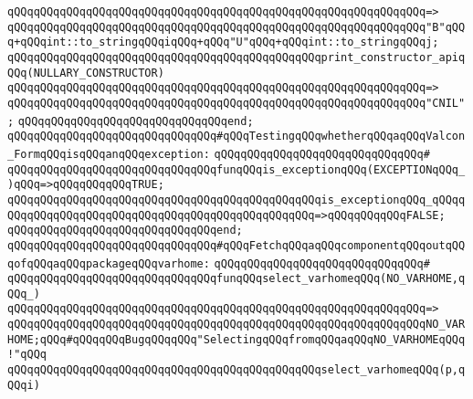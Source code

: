 \verb|qQQqqQQqqQQqqQQqqQQqqQQqqQQqqQQqqQQqqQQqqQQqqQQqqQQqqQQqqQQqqQQq=>|\newline
\verb|qQQqqQQqqQQqqQQqqQQqqQQqqQQqqQQqqQQqqQQqqQQqqQQqqQQqqQQqqQQqqQQq"B"qQQq+qQQqint::to_stringqQQqiqQQq+qQQq"U"qQQq+qQQqint::to_stringqQQqj;|\newline
\newline
\verb|qQQqqQQqqQQqqQQqqQQqqQQqqQQqqQQqqQQqqQQqqQQqqQQqprint_constructor_apiqQQq(NULLARY_CONSTRUCTOR)|\newline
\verb|qQQqqQQqqQQqqQQqqQQqqQQqqQQqqQQqqQQqqQQqqQQqqQQqqQQqqQQqqQQqqQQq=>|\newline
\verb|qQQqqQQqqQQqqQQqqQQqqQQqqQQqqQQqqQQqqQQqqQQqqQQqqQQqqQQqqQQqqQQq"CNIL";|\newline
\verb|qQQqqQQqqQQqqQQqqQQqqQQqqQQqqQQqend;|\newline
\newline
\newline
\verb|qQQqqQQqqQQqqQQqqQQqqQQqqQQqqQQq#qQQqTestingqQQqwhetherqQQqaqQQqValcon_FormqQQqisqQQqanqQQqexception:|\newline
\verb|qQQqqQQqqQQqqQQqqQQqqQQqqQQqqQQq#|\newline
\verb|qQQqqQQqqQQqqQQqqQQqqQQqqQQqqQQqfunqQQqis_exceptionqQQq(EXCEPTIONqQQq_)qQQq=>qQQqqQQqqQQqTRUE;|\newline
\verb|qQQqqQQqqQQqqQQqqQQqqQQqqQQqqQQqqQQqqQQqqQQqqQQqis_exceptionqQQq_qQQqqQQqqQQqqQQqqQQqqQQqqQQqqQQqqQQqqQQqqQQqqQQqqQQq=>qQQqqQQqqQQqFALSE;|\newline
\verb|qQQqqQQqqQQqqQQqqQQqqQQqqQQqqQQqend;|\newline
\newline
\newline
\verb|qQQqqQQqqQQqqQQqqQQqqQQqqQQqqQQq#qQQqFetchqQQqaqQQqcomponentqQQqoutqQQqofqQQqaqQQqpackageqQQqvarhome:|\newline
\verb|qQQqqQQqqQQqqQQqqQQqqQQqqQQqqQQq#|\newline
\verb|qQQqqQQqqQQqqQQqqQQqqQQqqQQqqQQqfunqQQqselect_varhomeqQQq(NO_VARHOME,qQQq_)|\newline
\verb|qQQqqQQqqQQqqQQqqQQqqQQqqQQqqQQqqQQqqQQqqQQqqQQqqQQqqQQqqQQqqQQq=>|\newline
\verb|qQQqqQQqqQQqqQQqqQQqqQQqqQQqqQQqqQQqqQQqqQQqqQQqqQQqqQQqqQQqqQQqNO_VARHOME;qQQq#qQQqqQQqBugqQQqqQQq"SelectingqQQqfromqQQqaqQQqNO_VARHOMEqQQq!"qQQq|\newline
\newline
\verb|qQQqqQQqqQQqqQQqqQQqqQQqqQQqqQQqqQQqqQQqqQQqqQQqselect_varhomeqQQq(p,qQQqi)|\newline
